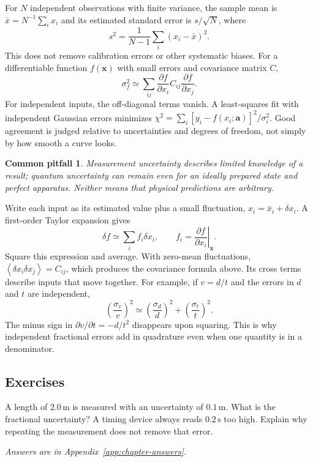 \documentclass[11pt,oneside]{book}
\newcommand{\vect}[1]{\boldsymbol{#1}}
\newcommand{\avg}[1]{\left\langle #1\right\rangle}
\newcommand{\pd}[2]{\frac{\partial #1}{\partial #2}}
\theoremstyle{reviewstyle}
\newtheorem*{pitfall}{Common pitfall}
\newcommand{\learningcheck}[1]{\subsection*{Exercises}\noindent #1\par\smallskip\noindent\emph{Answers are in Appendix~\ref{app:chapter-answers}.}}
\begin{document}
For $N$ independent observations with finite variance, the sample mean is $\bar x=N^{-1}\sum_i x_i$ and its estimated standard error is $s/\sqrt N$, where
\begin{equation}
s^2=\frac{1}{N-1}\sum_i(x_i-\bar x)^2.
\end{equation}
This does not remove calibration errors or other systematic biases. For a differentiable function $f(\vect x)$ with small errors and covariance matrix $C$,
\begin{equation}
\sigma_f^2\simeq\sum_{ij}\pd{f}{x_i}C_{ij}\pd{f}{x_j}.
\end{equation}
For independent inputs, the off-diagonal terms vanish. A least-squares fit with independent Gaussian errors minimizes
$\chi^2=\sum_i[y_i-f(x_i;\vect a)]^2/\sigma_i^2$.
Good agreement is judged relative to uncertainties and degrees of freedom, not simply by how smooth a curve looks.
\begin{pitfall}
Measurement uncertainty describes limited knowledge of a result; quantum uncertainty can remain even for an ideally prepared state and perfect apparatus. Neither means that physical predictions are arbitrary.
\end{pitfall}

Write each input as its estimated value plus a small fluctuation, $x_i=\bar x_i+\delta x_i$. A first-order Taylor expansion gives
\begin{equation}
\delta f\simeq\sum_i f_i\delta x_i,\qquad
f_i=\left.\pd{f}{x_i}\right|_{\vect{\bar x}}.
\end{equation}
Square this expression and average. With zero-mean fluctuations, $\avg{\delta x_i\delta x_j}=C_{ij}$, which produces the covariance formula above. Its cross terms describe inputs that move together. For example, if $v=d/t$ and the errors in $d$ and $t$ are independent,
\begin{equation}
\left(\frac{\sigma_v}{v}\right)^2\simeq
\left(\frac{\sigma_d}{d}\right)^2+
\left(\frac{\sigma_t}{t}\right)^2.
\end{equation}
The minus sign in $\partial v/\partial t=-d/t^2$ disappears upon squaring. This is why independent fractional errors add in quadrature even when one quantity is in a denominator.

\learningcheck{A length of $2.0\,\mathrm m$ is measured with an uncertainty of $0.1\,\mathrm m$. What is the fractional uncertainty? A timing device always reads $0.2\,\mathrm s$ too high. Explain why repeating the measurement does not remove that error.}
\end{document}
